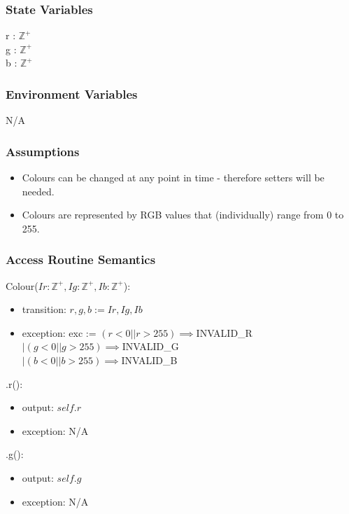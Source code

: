 \documentclass[12pt, titlepage]{article}
\begin{document}
\subsubsection{State Variables}
r : $\mathbb{Z}^+$ \\
g : $\mathbb{Z}^+$ \\
b : $\mathbb{Z}^+$ \\

\subsubsection{Environment Variables}
N/A

\subsubsection{Assumptions}
\begin{itemize}
	\item Colours can be changed at any point in time - therefore setters will 
	be needed.
	\item Colours are represented by RGB values that (individually) range from 
	0 to 255.
\end{itemize}

\subsubsection{Access Routine Semantics}
\noindent Colour($Ir: \mathbb{Z}^+, Ig: \mathbb{Z}^+, Ib: \mathbb{Z}^+$):
\begin{itemize}
	\item transition: $r, g, b := Ir, Ig, Ib$
	\item exception: exc := $(r < 0 || r > 255) \implies $INVALID\_R \\
		$ | (g < 0 || g > 255) \implies $INVALID\_G \\ $| (b < 0 || b > 255) 
		\implies $INVALID\_B
\end{itemize}

\noindent .r():
\begin{itemize}
	\item output: $self.r$
	\item exception: N/A
\end{itemize}

\noindent .g():
\begin{itemize}
	\item output: $self.g$
	\item exception: N/A
\end{itemize}
\end{document}
